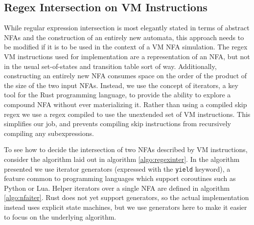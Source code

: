 
\subsection{Regex Intersection on VM Instructions}

While regular expression intersection is most elegantly stated
in terms of abstract NFAs and the construction of an entirely
new automata, this approach needs to be modified if it is
to be used in the context of a VM NFA simulation. The regex
VM instructions used for implementation are a representation
of an NFA, but not in the usual set-of-states and transition
table sort of way. Additionally, constructing an entirely
new NFA consumes space on the order of the product of the
size of the two input NFAs. Instead, we use the concept of
iterators, a key tool for the Rust programming language,
to provide the ability to explore a compound NFA without
ever materializing it. Rather than using a compiled
skip regex we use a regex compiled to use the unextended
set of VM instructions. This simplifies our job, and prevents
compiling skip instructions from recursively compiling any
subexpressions.

To see how to decide the intersection of two NFAs described
by VM instructions, consider the algorithm laid out in
algorithm \ref{algo:regexinter}. In the algorithm presented
we use iterator generators (expressed with the \verb'yield' keyword),
a feature common to programming languages which support coroutines
such as Python or Lua. Helper iterators over a single NFA are defined
in algorithm \ref{algo:nfaiter}. Rust does not yet support generators, so the
actual implementation instead uses explicit state machines, but
we use generators here to make it easier to focus on the underlying
algorithm.

